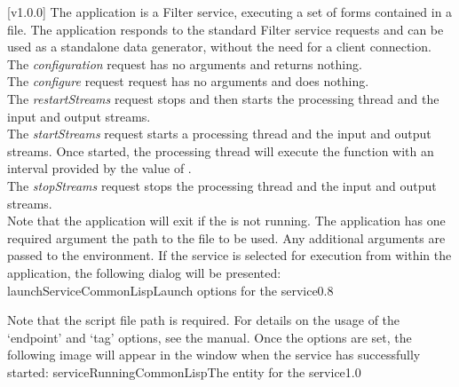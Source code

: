 [v1.0.0]
The  application is a Filter service, executing a set
of \CL{} forms contained in a file.
The application responds to the standard Filter service requests and can be used as a
standalone data generator, without the need for a client connection.\\

The \emph{configuration} request has no arguments and returns nothing.\\

The \emph{configure} request request has no arguments and does nothing.\\

The \emph{restartStreams} request stops and then starts the processing thread and the
input and output streams.\\

The \emph{startStreams} request starts a processing thread and the input and output
streams.
Once started, the processing thread will execute the  function with
an interval provided by the value of .\\

The \emph{stopStreams} request stops the processing thread and the input and output
streams.\\ 

Note that the application will exit if the \emph{\RS} is not running.
The application has one required argument \longDash{} the path to the \CL{} file to be
used.
Any additional arguments are passed to the \CL{} environment.
\insertAppParameters
\insertTagDescription{\CLF}
\insertFilterServiceComment
\condPage
\insertStandardServiceCommands
\secondaryEnd
\condPage
{}
If the service is selected for execution from within the \emph{\MMMU} application, the
following dialog will be presented:
%
{launchServiceCommonLisp}{Launch options for the \emph{\CLF} service}{0.8}

Note that the script file path is required.
For details on the usage of the `endpoint' and `tag' options, see the \emph{\MMMU} manual.
Once the options are set, the following image will appear in the \emph{\MMMU} window when
the service has successfully started:
%
{serviceRunningCommonLisp}{The \emph{\MMMU} entity for the \emph{\CLF} service}{1.0}

